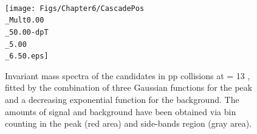 \begin{landscape}
\begin{figure}[h]
\begin{minipage}[t]{.25\textwidth}
    \end{minipage}  \\
    \begin{minipage}[t]{.25\textwidth}
        \hspace*{-2.5cm}
        \texttt{[image: Figs/Chapter6/CascadePos\\\_Mult0.00\\\_50.00-dpT\\\_5.00\\\_6.50.eps]}
    \end{minipage}
    \hfill
	\caption{Invariant mass spectra of the \rmAxiP candidates in pp collisions at \sqrtS = 13 \tev, fitted by the combination of three Gaussian functions for the peak and a decreasing exponential function for the background. The amounts of signal and background have been obtained via bin counting in the peak (red area) and side-bands region (gray area).}
	\label{fig:InvMassXiPlusVPt}
\end{figure}



\end{landscape}

